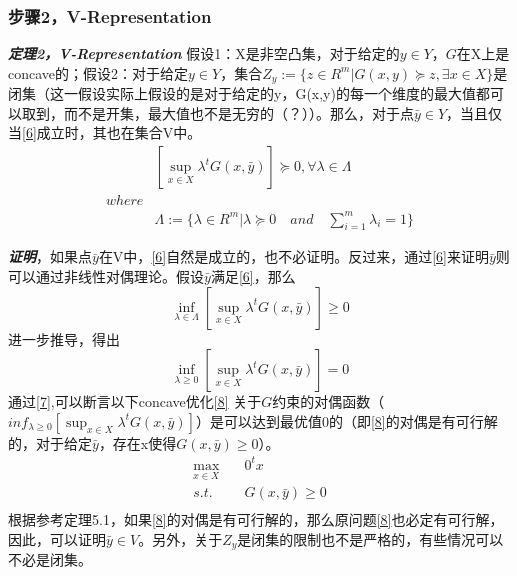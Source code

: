 \documentclass[UTF8,a4]{article}
\begin{document}
\subsubsection{步骤2，V-Representation}
\textbf{\emph{定理2，V-Representation}}
假设1：X是非空凸集，对于给定的$y\in Y$，$G$在X上是concave的；假设2：对于给定$y\in Y$，集合$Z_y:=\{z\in R^m|G(x,y)\succeq z, \exists x\in X\}$是闭集（这一假设实际上假设的是对于给定的y，G(x,y)的每一个维度的最大值都可以取到，而不是开集，最大值也不是无穷的（？））。那么，对于点$\bar{y}\in Y$，当且仅当\eqref{6}成立时，其也在集合V中。
\begin{equation}
\label{6}
\begin{split}
&[\sup_{x\in X}\lambda^tG(x,\bar{y})]\succeq 0,\forall\lambda\in\Lambda\\
where\\
&\Lambda:=\{\lambda\in R^m|\lambda\succeq 0\quad and \quad \sum_{i=1}^m\lambda_i=1\}
\end{split}
\end{equation}

\textbf{\emph{证明}}，如果点$\bar{y}$在V中，\eqref{6}自然是成立的，也不必证明。反过来，通过\eqref{6}来证明$\bar{y}$则可以通过非线性对偶理论。假设$\bar{y}$满足\eqref{6}，那么
$$
\inf_{\lambda\in\Lambda}[\sup_{x \in X} \lambda^t G(x,\bar{y})]\geqslant0
$$
进一步推导，得出
\begin{equation}
\label{7}
\inf_{\lambda\geqslant0}[\sup_{x\in X}\lambda^tG(x,\bar{y})]=0
\end{equation}
通过\eqref{7},可以断言以下concave优化\eqref{8} 关于$G$约束的对偶函数（$inf_{\lambda\geqslant0}[\sup_{x\in X}\lambda^tG(x,\bar{y})]$）是可以达到最优值0的（即\eqref{8}的对偶是有可行解的，对于给定$\bar{y}$，存在x使得$G(x,\bar{y})\geqslant 0$）。
\begin{equation}
\label{8}
\begin{split}
\max_{x\in X}&\quad 0^t x\\
s.t.&\quad G(x,\bar{y})\geqslant0\\
\end{split}
\end{equation}
根据参考定理5.1，如果\eqref{8}的对偶是有可行解的，那么原问题\eqref{8}也必定有可行解，因此，可以证明$\bar{y}\in V$。另外，关于$Z_y$是闭集的限制也不是严格的，有些情况可以不必是闭集。
\end{document}
